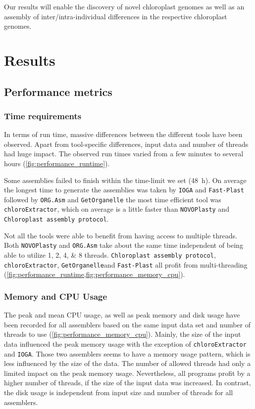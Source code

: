 \documentclass{bmcart}
\newcommand{\formatprogramnames}[1]{\texttt{#1}}
\newcommand{\ce}{\formatprogramnames{chloroExtractor}}
\newcommand{\oa}{\formatprogramnames{ORG.Asm}}
\newcommand{\fp}{\formatprogramnames{Fast-Plast}}
\newcommand{\ioga}{\formatprogramnames{IOGA}}
\newcommand{\np}{\formatprogramnames{NOVOPlasty}}
\newcommand{\go}{\formatprogramnames{GetOrganelle}}
\newcommand{\cassp}{\formatprogramnames{Chloroplast assembly protocol}}
\begin{document}
Our results will enable the discovery of novel chloroplast genomes as well as an assembly of inter/intra-individual differences in the respective chloroplast genomes.  

\section*{Results}
\subsection*{Performance metrics}

\subsubsection*{Time requirements}
In terms of run time, massive differences between the different tools have been observed. Apart from tool-specific differences, input data and number of threads had huge impact. The observed run times varied from a few minutes to several hours (\cref{fig:performance_runtime}).

Some assemblies failed to finish within the time-limit we set (\SI{48}{\hour}). 
On average the longest time to generate the assemblies was taken by \ioga{} and \fp{} followed by \oa{} and \go{} the most time efficient tool was \ce{}, which on average is a little faster than \np{} and \cassp{}.

Not all the tools were able to benefit from having access to multiple threads. Both \np{} and \oa{} take about the same time independent of being able to utilize \numlist[list-final-separator={, or }]{1;2;4;8} threads. \cassp{}, \ce{}, \go  and \fp{} all profit from multi-threading (\cref{fig:performance_runtime,fig:performance_memory_cpu}).

\subsubsection*{Memory and CPU Usage }
The peak and mean CPU usage, as well as peak memory and disk usage have been recorded for all assemblers based on the same input data set and number of threads to use (\cref{fig:performance_memory_cpu}).
Mainly, the size of the input data influenced the peak memory usage with the exception of \ce{} and \ioga{}.
Those two assemblers seems to have a memory usage pattern, which is less influenced by the size of the data.
The number of allowed threads had only a limited impact on the peak memory usage.
Nevertheless, all programs profit by a higher number of threads, if the size of the input data was increased.
In contrast, the disk usage is independent from input size and number of threads for all assemblers.
\end{document}
